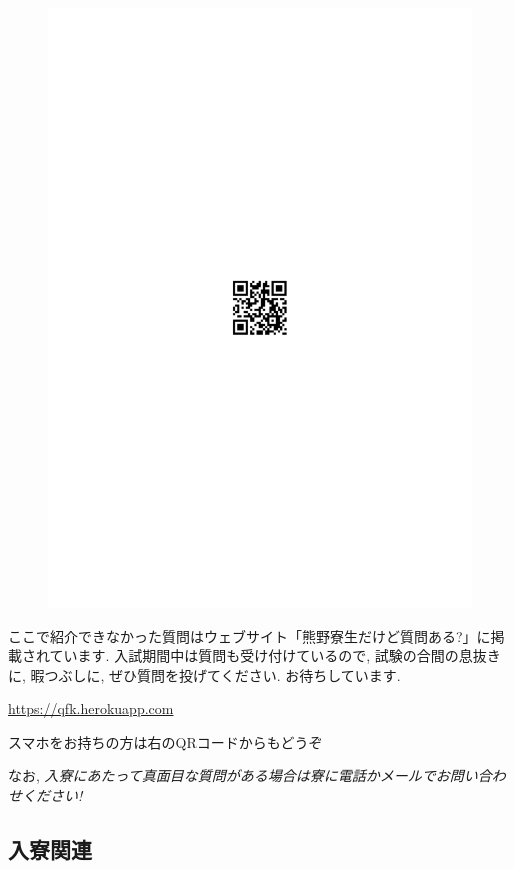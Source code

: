 \documentclass[10pt,b5jsbook,dvips,dvipdfmx,openany]{jsbook}
\theoremstyle{definition}
\begin{document}
\begin{figure}
 	 		\includegraphics[scale=0.8]{shitumon.pdf}
			\label{fig:UT}
			\end{figure}

ここで紹介できなかった質問はウェブサイト「熊野寮生だけど質問ある?」に掲載されています. 入試期間中は質問も受け付けているので, 試験の合間の息抜きに, 暇つぶしに, ぜひ質問を投げてください. お待ちしています. 

\url{https://qfk.herokuapp.com}

スマホをお持ちの方は右のQRコードからもどうぞ

なお, \emph{入寮にあたって真面目な質問がある場合は寮に電話かメールでお問い合わせください!}

		\subsection{入寮関連}
		
\end{document}
